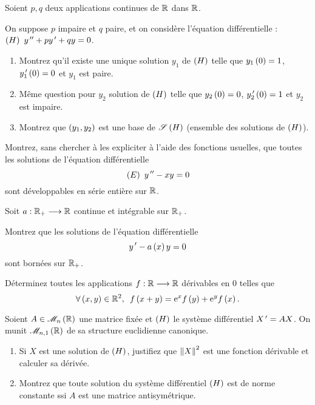 \begin{exoss}
Soient \(p,q\) deux applications continues de \(\mathbb{R}\) dans \(\mathbb{R}\).

On suppose \(p\) impaire et \(q\) paire, et on considère l'équation différentielle : \(\left(H\right)~y^{\,\prime\prime}+py^{\,\prime}+qy=0\).

\begin{enumerate}
    \item Montrez qu'il existe une unique solution \(y_1\) de \(\left(H\right)\) telle que \(y_1\left(0\right)=1\), \(y_1^{\,\prime}\left(0\right)=0\) et \(y_1\) est paire. \\
    \item Même question pour \(y_2\) solution de \(\left(H\right)\) telle que \(y_2\left(0\right)=0\), \(y_2^{\,\prime}\left(0\right)=1\) et \(y_2\) est impaire. \\
    \item Montrez que \(\left(y_1,y_2\right)\) est une base de \(\mathscr{S}\left(H\right)\) (ensemble des solutions de \(\left(H\right)\)).
\end{enumerate}
\end{exoss}

\begin{exoss}
Montrez, sans chercher à les expliciter à l'aide des fonctions usuelles, que toutes les solutions de l'équation différentielle \[\left(E\right)~y^{\,\prime\prime}-xy=0\] sont développables en série entière sur \(\mathbb{R}\).
\end{exoss}

\begin{exoss}
Soit \(a:\mathbb{R}_+\longrightarrow\mathbb{R}\) continue et intégrable sur \(\mathbb{R}_+\).

Montrez que les solutions de l'équation différentielle \[y^{\,\prime}-a\left(x\right)y=0\] sont bornées sur \(\mathbb{R}_+\).
\end{exoss}

\begin{exoss}
Déterminez toutes les applications \(f:\mathbb{R}\longrightarrow\mathbb{R}\) dérivables en \(0\) telles que \[\quantifs{\forall\paren{x,y}\in\R^2}f\paren{x+y}=\e{x}f\paren{y}+\e{y}f\paren{x}.\]
\end{exoss}

\begin{exoss}
Soient \(A\in\M{n}[\R]\) une matrice fixée et \(\left(H\right)\) le système différentiel \(X^{\,\prime}=AX\). On munit \(\M{n,1}[\R]\) de sa structure euclidienne canonique.

\begin{enumerate}
    \item Si \(X\) est une solution de \(\left(H\right)\), justifiez que \(\norme{X}^2\) est une fonction dérivable et calculer sa dérivée. \\
    \item Montrez que toute solution du système différentiel \(\left(H\right)\) est de norme constante ssi \(A\) est une matrice antisymétrique.
\end{enumerate}
\end{exoss}

